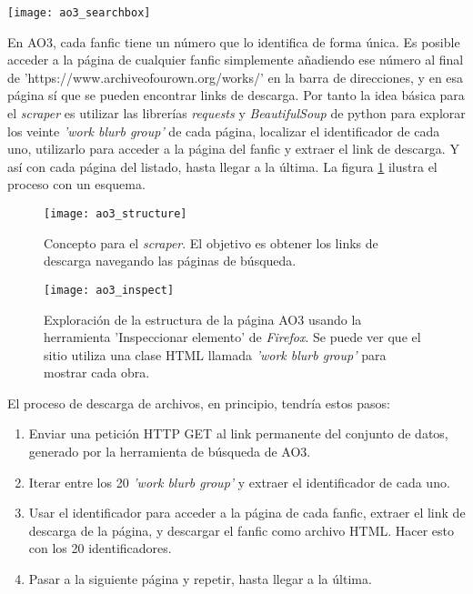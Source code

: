 \documentclass{pre-tfg}
\begin{document}
\newpage
\begin{SCfigure}
	\caption{Herramienta de filtrado de AO3. Permite excluir (o incluir) obras que contengan etiquetas específicas, así cómo aquellas no escritas en un idioma particular}
	\label{fig:ao3_search}
	\texttt{[image: ao3\_searchbox]}
	\centering
\end{SCfigure}


En AO3, cada fanfic tiene un número que lo identifica de forma única. Es posible acceder a la página de cualquier fanfic simplemente añadiendo ese número al final de \newline 'https://www.archiveofourown.org/works/' en la barra de direcciones, y en esa página sí que se pueden encontrar links de descarga.
Por tanto la idea básica para el \textit{scraper} es utilizar las librerías \textit{requests} y \textit{BeautifulSoup} de python para explorar los veinte \textit{'work blurb group'} de cada página, localizar el identificador de cada uno, utilizarlo para acceder a la página del fanfic y extraer el link de descarga. Y así con cada página del listado, hasta llegar a la última. La figura \ref{fig:ao3_structure} ilustra el proceso con un esquema.

\begin{figure}[h]
	\texttt{[image: ao3\_structure]}
	\caption{Concepto para el \textit{scraper}. El objetivo es obtener los links de descarga navegando las páginas de búsqueda.}
	\label{fig:ao3_structure}
	\centering
\end{figure}

\newpage

\begin{figure}
	\texttt{[image: ao3\_inspect]}
	\caption{Exploración de la estructura de la página AO3 usando la herramienta 'Inspeccionar elemento' de \textit{Firefox}. Se puede ver que el sitio utiliza una clase HTML llamada \textit{'work blurb group'} para mostrar cada obra.}
	\label{fig:ao3_inspect}
	\centering
\end{figure} 



El proceso de descarga de archivos, en principio, tendría estos pasos:

\begin{enumerate}
	\item Enviar una petición HTTP GET al link permanente del conjunto de datos, generado por la herramienta de búsqueda de AO3.
	\item Iterar entre los 20 \textit{'work blurb group'} y extraer el identificador de cada uno.
	\item Usar el identificador para acceder a la página de cada fanfic, extraer el link de descarga de la página, y descargar el fanfic como archivo HTML. Hacer esto con los 20 identificadores.
	\item Pasar a la siguiente página y repetir, hasta llegar a la última.
\end{enumerate}
\end{document}
